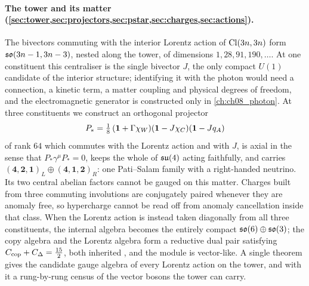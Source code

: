 \paragraph{The tower and its matter (\cref{sec:tower,sec:projectors,sec:pstar,sec:charges,sec:actions}).} The bivectors
commuting with the interior Lorentz action of $\mathrm{Cl}(3n,3n)$ form $\mathfrak{so}(3n-1,3n-3)$, nested along the tower, of dimensions
$1,28,91,190,\dots$. At one constituent this centraliser is the single bivector $J$, the only compact $U(1)$ candidate of the
interior structure; identifying it with the photon would need a connection, a kinetic term, a matter coupling and physical degrees of
freedom, and the electromagnetic generator is constructed only in \cref{ch:ch08_photon}. At three constituents we construct an orthogonal projector
\[
P_*=\tfrac18\,(\mathbf 1+\Gamma\chi_W)(\mathbf 1-J\chi_C)(\mathbf 1-Jq_A)
\]
of rank $64$ which commutes with the Lorentz action and with $J$, is axial in the sense that $P_*\gamma^\mu P_*=0$, keeps the whole of
$\mathfrak{su}(4)$ acting faithfully, and carries $(\mathbf4,\mathbf2,\mathbf1)_L\oplus(\mathbf4,\mathbf1,\mathbf2)_R$: one Pati--Salam
family with a right-handed neutrino. Its two central abelian factors cannot be gauged on this matter. Charges built from
three commuting involutions are conjugately paired whenever they are anomaly free, so hypercharge cannot be read off from
anomaly cancellation inside that class. When the Lorentz action is instead taken diagonally from all three constituents,
the internal algebra becomes the entirely compact $\mathfrak{so}(6)\oplus\mathfrak{so}(3)$; the copy algebra and the Lorentz algebra form a
reductive dual pair satisfying $C_{\rm cop}+C_\Delta=\tfrac{15}2$, both inherited \cite{Howe89,Neergard19}, and the module is vector-like. A single theorem gives
the candidate gauge algebra of every Lorentz action on the tower, and with it a rung-by-rung census of the vector bosons
the tower can carry.

